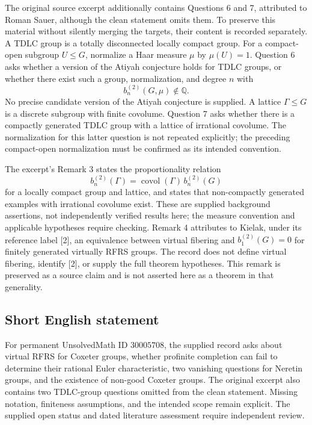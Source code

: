 \documentclass[11pt]{article}
\newcommand{\Q}{\mathbb{Q}}
\begin{document}
The original source excerpt additionally contains Questions 6 and 7, attributed to Roman Sauer, although the clean statement omits them. To preserve this material without silently merging the targets, their content is recorded separately. A TDLC group is a totally disconnected locally compact group. For a compact-open subgroup \(U\leq G\), normalize a Haar measure \(\mu\) by \(\mu(U)=1\). Question 6 asks whether a version of the Atiyah conjecture holds for TDLC groups, or whether there exist such a group, normalization, and degree \(n\) with
\[
b_n^{(2)}(G,\mu)\notin\Q.
\]
No precise candidate version of the Atiyah conjecture is supplied. A lattice \(\Gamma\leq G\) is a discrete subgroup with finite covolume. Question 7 asks whether there is a compactly generated TDLC group with a lattice of irrational covolume. The normalization for this latter question is not repeated explicitly; the preceding compact-open normalization must be confirmed as its intended convention.

The excerpt's Remark 3 states the proportionality relation
\[
b_n^{(2)}(\Gamma)=\operatorname{covol}(\Gamma)\,b_n^{(2)}(G)
\]
for a locally compact group and lattice, and states that non-compactly generated examples with irrational covolume exist. These are supplied background assertions, not independently verified results here; the measure convention and applicable hypotheses require checking. Remark 4 attributes to Kielak, under its reference label [2], an equivalence between virtual fibering and \(b_1^{(2)}(G)=0\) for finitely generated virtually RFRS groups. The record does not define virtual fibering, identify [2], or supply the full theorem hypotheses. This remark is preserved as a source claim and is not asserted here as a theorem in that generality.
\subsection{Short English statement}
For permanent UnsolvedMath ID \(30005708\), the supplied record asks about virtual RFRS for Coxeter groups, whether profinite completion can fail to determine their rational Euler characteristic, two vanishing questions for Neretin groups, and the existence of non-good Coxeter groups. The original excerpt also contains two TDLC-group questions omitted from the clean statement. Missing notation, finiteness assumptions, and the intended scope remain explicit. The supplied open status and dated literature assessment require independent review.
\end{document}
